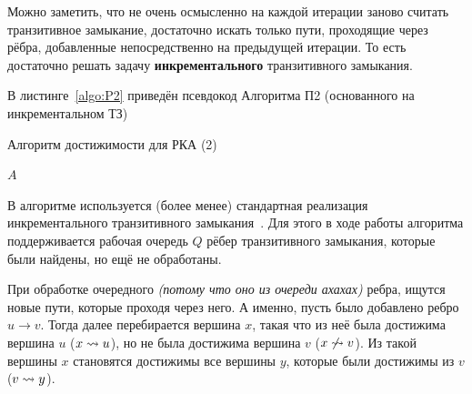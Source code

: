     Можно заметить, что не очень осмысленно на каждой итерации заново считать транзитивное замыкание, достаточно искать только пути, проходящие через рёбра, добавленные непосредственно на предыдущей итерации. То есть достаточно решать задачу {\bf инкрементального} транзитивного замыкания. 

    В листинге~\ref{algo:P2} приведён псевдокод Алгоритма П2 (основанного на инкрементальном ТЗ)

    \begin{algorithm}[H]
        \begin{algorithmic}[1]
        \caption{Алгоритм достижимости для РКА (2)}
        \label{algo:P2}
                \EndFor
            \EndFor
                \EndIf
                            \EndIf
                        \EndFor
                    \EndIf
                \EndFor
            \EndWhile
        \State \Return $A$
        \EndFunction
        \end{algorithmic}
    \end{algorithm}

    В алгоритме используется (более менее) стандартная реализация инкрементального транзитивного замыкания~\cite{Ibaraki1983}. Для этого в ходе работы алгоритма поддерживается рабочая очередь $Q$ рёбер транзитивного замыкания, которые были найдены, но ещё не обработаны. 

    При обработке очередного \textit{(потому что оно из очереди ахахах)} ребра, ищутся новые пути, которые проходя через него. А именно, пусть было добавлено ребро $u \to v$. Тогда далее перебирается вершина $x$, такая что из неё была достижима вершина $u$ ($x \rightsquigarrow u$), но не была достижима вершина $v$ ($x \not\rightsquigarrow v$). Из такой вершины $x$ становятся достижимы все вершины $y$, которые были достижимы из $v$ ($v \rightsquigarrow y$).

